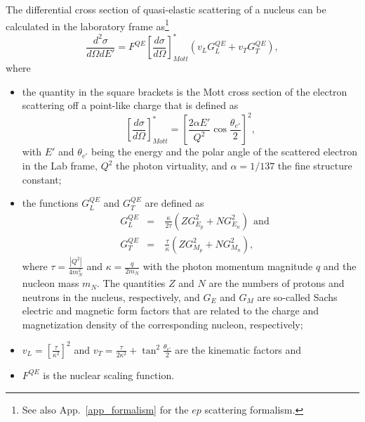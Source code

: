 The differential cross section of quasi-elastic scattering of a nucleus can be calculated in the laboratory frame as\footnote[2]{See also App.~\ref{app_formalism} for the $ep$ scattering formalism.}
\begin{equation}
\frac{d^{2}\sigma}{d\Omega dE'} = F^{QE}\left [ \frac{d\sigma}{d\Omega} \right ]^{*}_{Mott}\left (v_{L}G_{L}^{QE} + v_{T}G_{T}^{QE} \right ),
\end{equation}
where %
\begin{itemize}
\item the quantity in the square brackets is the Mott cross section of the electron scattering off a point-like charge that is defined as
\begin{equation}
\left [ \frac{d\sigma}{d\Omega} \right ]^{*}_{Mott} = \left [ \frac{2\alpha E'}{Q^{2}}\cos \frac{\theta_{e'}}{2} \right ]^{2},
\label{eq:mott}
\end{equation}
with $E'$ and $\theta_{e'}$ being the energy and the polar angle of the scattered electron in the Lab frame, $Q^{2}$ the photon virtuality, and $\alpha=1/137$ the fine structure constant;   %
\item the functions $G_{L}^{QE}$ and $G_{T}^{QE}$ are defined as
\begin{equation}
\begin{aligned}
&G_{L}^{QE}&=~&\frac{\kappa}{2\tau}\left ( ZG_{E_{p}}^{2}+NG_{E_{n}}^{2} \right )~~\textrm{and}\\
&G_{T}^{QE}&=~&\frac{\tau}{\kappa}\left ( ZG_{M_{p}}^{2}+NG_{M_{n}}^{2} \right ),
\label{eq:eee}
\end{aligned}
\end{equation}
where $\tau = \frac{|Q^{2}|}{4m_{N}^{2}}$ and $\kappa = \frac{q}{2m_{N}}$ with the photon momentum magnitude $q$ and the nucleon mass $m_{N}$. The quantities $Z$ and $N$ are the numbers of protons and neutrons in the nucleus, respectively, and $G_{E}$ and $G_{M}$ are so-called Sachs electric and magnetic form factors that are related to the charge and magnetization density of the corresponding nucleon, respectively;  %
\item  $v_{L} = \left [\frac{\tau}{\kappa^{2}} \right ]^{2} $ and $v_{T} = \frac{\tau}{2\kappa^{2}} +\tan^{2}{\frac{\theta_{e'}}{2}}$ are the kinematic factors and%
\item $F^{QE}$ is the nuclear scaling function.%
\end{itemize}

